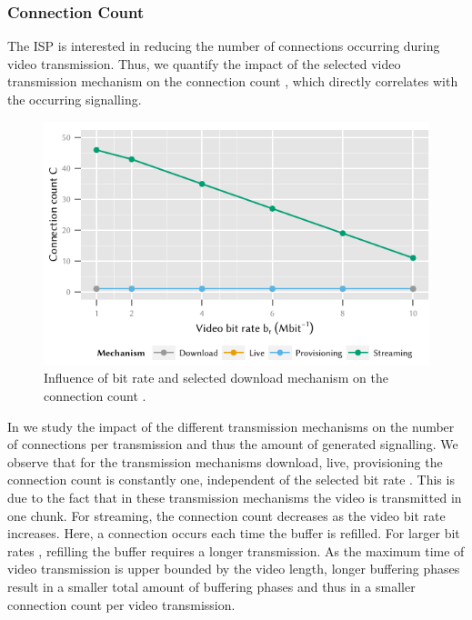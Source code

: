 \subsubsection*{Connection Count}\label{sec:application:lte_video:connection_count}
The \gls{ISP} is interested in reducing the number of connections occurring during video transmission.
Thus, we quantify the impact of the selected video transmission mechanism on the connection count \connectioncount, which directly correlates with the occurring signalling.

\begin{figure}
  \centering
  \includegraphics{application/lte_video/numerical_evaluation/figures/bitrate2connections}
  \caption{Influence of bit rate \bitrate and selected download mechanism on the connection count \connectioncount.}
  \label{fig:application:lte_video:numerical_evaluation:energy_consumption:bitrate2connections}
\end{figure}

In  we study the impact of the different transmission mechanisms on the number of connections per transmission and thus the amount of generated signalling.
We observe that for the transmission mechanisms download, live, provisioning the connection count \connectioncount is constantly one, independent of the selected bit rate \bitrate.
This is due to the fact that in these transmission mechanisms the video is transmitted in one chunk.
For streaming, the connection count \connectioncount decreases as the video bit rate \bitrate increases.
Here, a connection occurs each time the buffer is refilled.
For larger bit rates \bitrate, refilling the buffer requires a longer transmission.
As the maximum time of video transmission is upper bounded by the video length, longer buffering phases result in a smaller total amount of buffering phases and thus in a smaller connection count \connectioncount per video transmission.

